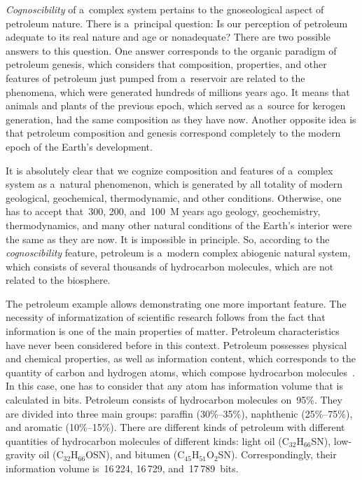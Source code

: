 \begin{multicols}{2}
{}
     
     \textit{Cognoscibility} of a~complex system pertains to the gnoseological 
aspect of petroleum nature. There is a~principal question: Is our perception of 
petroleum adequate to its real nature and age or nonadequate? There are two 
possible answers to this question. One answer corresponds to the organic paradigm 
of petroleum genesis, which considers that composition, properties, and other 
features of petroleum just pumped from a~reservoir are related to the phenomena, 
which were generated hundreds of millions years ago. It means that animals and 
plants of the previous epoch, which served as a~source for kerogen generation, had 
the same composition as they have now. Another opposite idea is that petroleum 
composition and genesis correspond completely to the modern epoch of the Earth's 
development. 
     
     It is absolutely clear that we cognize composition and features of a~complex 
system as a~natural phenomenon, which is generated by all totality of modern 
geological, geochemical, thermodynamic, and other conditions. Otherwise, one has 
to accept that~300, 200, and~100~M years ago geology, geochemistry, 
thermodynamics, and many other natural conditions of the Earth's interior were the 
same as they are now. It is impossible in principle. So, according to the 
\textit{cognoscibility} feature, petroleum is a~modern complex abiogenic natural 
system, which consists of several thousands of hydrocarbon molecules, which are 
not related to the biosphere.
{

}
     
     The petroleum example allows demonstrating one more important feature. 
The necessity of informatization of scientific research follows from the fact that 
information is one of the main properties of matter. Petroleum characteristics have 
never been considered before in this context. Petroleum possesses physical and 
chemical properties, as well as information content, which corresponds to the 
quantity of carbon and hydrogen atoms, which compose hydrocarbon 
molecules~\cite{13-seif}. In this case, one has to consider that any atom has 
information volume that is calculated in bits. Petroleum consists of hydrocarbon 
molecules on~95\%. They are divided into three main groups: paraffin  
(30\%--35\%), naphthenic (25\%--75\%), and aromatic (10\%--15\%). There are 
different kinds of petroleum with different quantities of hydrocarbon molecules of 
different kinds: light oil (C$_{32}$H$_{66}$SN), low-gravity oil 
(C$_{32}$H$_{66}$OSN), and bitumen (C$_{45}$H$_{51}$O$_2$SN). 
Correspondingly, their information volume is~16\,224, 16\,729, and~17\,789~bits.
     

\end{multicols}
